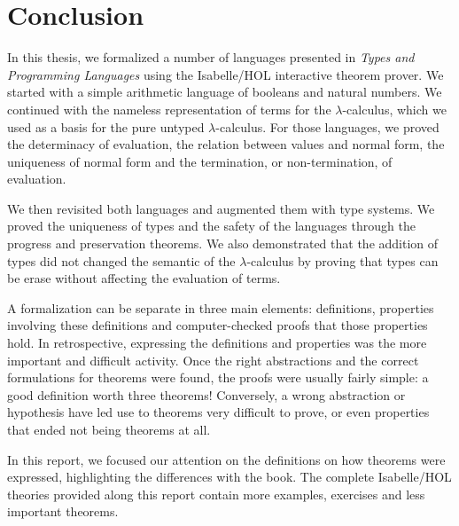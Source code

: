\section{Conclusion}

In this thesis, we formalized a number of languages presented in \emph{Types and Programming
Languages} using the Isabelle/HOL interactive theorem prover. We started with a simple arithmetic
language of booleans and natural numbers. We continued with the nameless representation of terms for
the $\lambda$-calculus, which we used as a basis for the pure untyped $\lambda$-calculus. For those
languages, we proved the determinacy of evaluation, the relation between values and normal form, the
uniqueness of normal form and the termination, or non-termination, of evaluation.

We then revisited both languages and augmented them with type systems. We proved the uniqueness of
types and the safety of the languages through the progress and preservation theorems. We also
demonstrated that the addition of types did not changed the semantic of the $\lambda$-calculus by
proving that types can be erase without affecting the evaluation of terms.

A formalization can be separate in three main elements: definitions, properties involving these
definitions and computer-checked proofs that those properties hold. In retrospective, expressing the
definitions and properties was the more important and difficult activity. Once the right
abstractions and the correct formulations for theorems were found, the proofs were usually fairly
simple: a good definition worth three theorems! Conversely, a wrong abstraction or hypothesis
have led use to theorems very difficult to prove, or even properties that ended not being theorems
at all.

In this report, we focused our attention on the definitions on how theorems were expressed,
highlighting the differences with the book. The complete Isabelle/HOL theories provided along this
report contain more examples, exercises and less important theorems.
